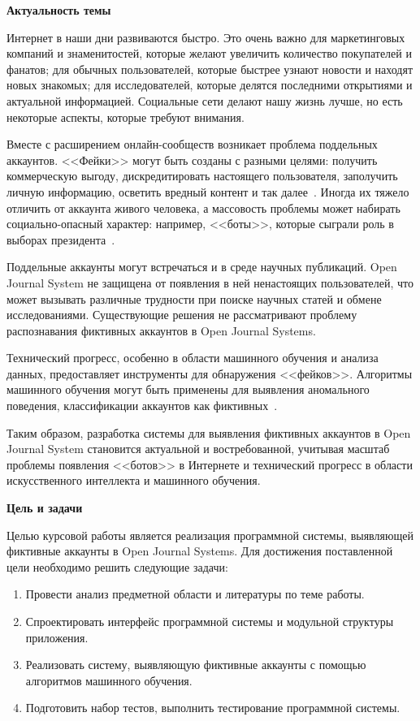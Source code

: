 \newpage
{}

\textbf{Актуальность темы}

Интернет в наши дни развиваются быстро. Это очень важно для маркетинговых компаний и знаменитостей, которые желают увеличить количество покупателей и фанатов; для обычных пользователей, которые быстрее узнают новости и находят новых знакомых; для исследователей, которые делятся последними открытиями и актуальной информацией. Социальные сети делают нашу жизнь лучше, но есть некоторые аспекты, которые требуют внимания.

Вместе с расширением онлайн-сообществ возникает проблема поддельных аккаунтов. <<Фейки>> могут быть созданы с разными целями: получить коммерческую выгоду, дискредитировать настоящего пользователя, заполучить личную информацию, осветить вредный контент и так далее~\cite{BoshmafMBR11}. Иногда их тяжело отличить от аккаунта живого человека, а массовость проблемы может набирать социально-опасный характер: например, <<боты>>, которые сыграли роль в выборах президента~\cite{HsuKJ19}.

Поддельные аккаунты могут встречаться и в среде научных публикаций. Open Journal System не защищена от появления в ней ненастоящих пользователей, что может вызывать различные трудности при поиске научных статей и обмене исследованиями. Существующие решения не рассматривают проблему распознавания фиктивных аккаунтов в Open Journal Systems.

Технический прогресс, особенно в области машинного обучения и анализа данных, предоставляет инструменты для обнаружения <<фейков>>. Алгоритмы машинного обучения могут быть применены для выявления аномального поведения, классификации аккаунтов как фиктивных~\cite{HassanAA23}.

Таким образом, разработка системы для выявления фиктивных аккаунтов в Open Journal System становится актуальной и востребованной, учитывая масштаб проблемы появления <<ботов>> в Интернете и технический прогресс в области искусственного интеллекта и машинного обучения.

\textbf{Цель и задачи}

Целью курсовой работы является реализация программной системы, выявляющей фиктивные аккаунты в Open Journal Systems. Для достижения поставленной цели необходимо решить следующие задачи:

\begin{enumerate}[itemindent=2cm, leftmargin=0cm, labelsep=0.4cm, topsep=0cm, itemsep=0cm, parsep=0cm, label=\arabic*., after=\vspace{-0.1cm}, before=\vspace{-0.1cm}]
	\item Провести анализ предметной области и литературы по теме работы.
	\item Спроектировать интерфейс программной системы и модульной структуры приложения.
	\item Реализовать систему, выявляющую фиктивные аккаунты с помощью алгоритмов машинного обучения.
        \item Подготовить набор тестов, выполнить тестирование программной системы.
\end{enumerate}

